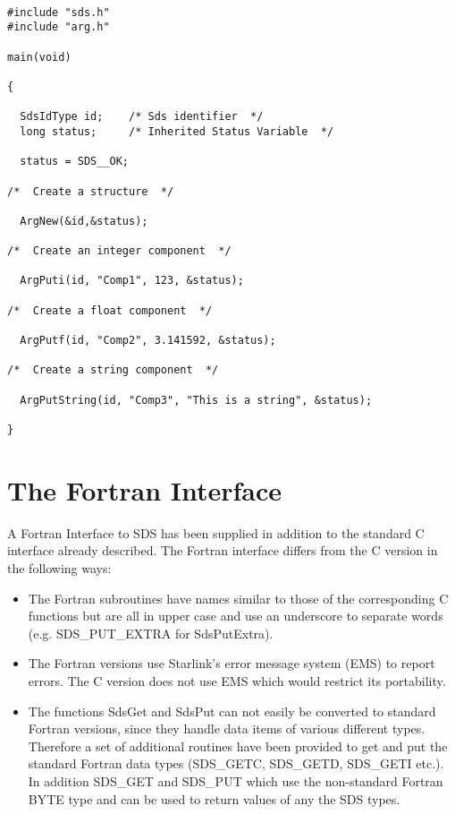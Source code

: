 \begin{verbatim}

#include "sds.h"
#include "arg.h"

main(void)

{

  SdsIdType id;    /* Sds identifier  */
  long status;     /* Inherited Status Variable  */

  status = SDS__OK;

/*  Create a structure  */

  ArgNew(&id,&status);

/*  Create an integer component  */

  ArgPuti(id, "Comp1", 123, &status);

/*  Create a float component  */

  ArgPutf(id, "Comp2", 3.141592, &status);

/*  Create a string component  */

  ArgPutString(id, "Comp3", "This is a string", &status);

}
\end{verbatim}



\section{The Fortran Interface}

A Fortran Interface to SDS has been supplied in addition to the standard C
interface already described. The Fortran interface differs from the C version
in the following ways:

\begin{itemize}

\item The Fortran subroutines have names similar to those of the corresponding
C functions but are all in upper case and use an underscore to separate words
(e.g. SDS\_PUT\_EXTRA for SdsPutExtra).

\item The Fortran versions use Starlink's error message system (EMS) to
report errors. The C version does not use EMS which would restrict its
portability.

\item The functions SdsGet and SdsPut can not easily be converted to
standard Fortran versions, since they handle data items of various different
types. Therefore a set of additional routines have been provided to get and put
the standard Fortran data types (SDS\_GETC, SDS\_GETD, SDS\_GETI etc.). In
addition SDS\_GET and SDS\_PUT which use the non-standard Fortran BYTE type and
can be used to return values of any the SDS types.

\end{itemize}

